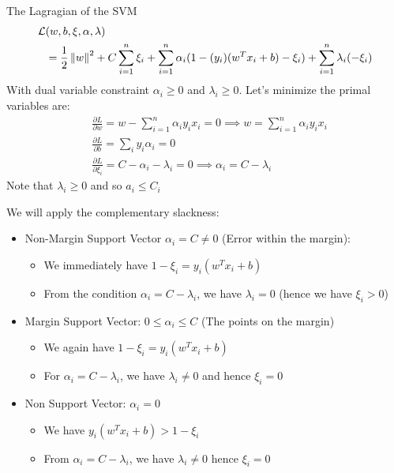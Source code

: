 \begin{remark}
    The Lagragian of the SVM 
    \begin{equation*}
    \begin{aligned}
        \mathcal{L}&(w, b,\xi,\alpha,\lambda) \\
        &= \frac{1}{2}\left\lVert w\right\rVert^2 + C\sum^n_{i=1}\xi_i + \sum^n_{i=1}\alpha_i(1-(y_i)(w^Tx_i + b)-\xi_i) + \sum^n_{i=1}\lambda_i(-\xi_i) 
    \end{aligned}
    \end{equation*}
    With dual variable constraint $\alpha_i\ge0$ and $\lambda_i\ge0$. Let's minimize the primal variables are:
    \begin{equation*}
    \begin{aligned}
        &\frac{\partial L}{\partial w} = w -\sum^n_{i=1}\alpha_iy_ix_i=0\implies w = \sum^n_{i=1}\alpha_iy_ix_i \\
        &\frac{\partial L}{\partial b} = \sum_iy_i\alpha_i = 0 \\
        &\frac{\partial L}{\partial \xi_i} = C-\alpha_i-\lambda_i = 0 \implies \alpha_i = C -\lambda_i
    \end{aligned}
    \end{equation*}    
    Note that $\lambda_i\ge0$ and so $a_i\le C_i$
\end{remark}
\begin{remark}
    We will apply the complementary slackness: 
    \begin{itemize}
        \item Non-Margin Support Vector $\alpha_i=C\ne0$ (Error within the margin):
        \begin{itemize}
            \item We immediately have $1-\xi_i = y_i(w^Tx_i + b)$
            \item From the condition $\alpha_i = C-\lambda_i$, we have $\lambda_i = 0$ (hence we have $\xi_i>0$)
        \end{itemize}
        \item Margin Support Vector: $0\le\alpha_i\le C$ (The points on the margin)
        \begin{itemize}
            \item We again have $1-\xi_i = y_i(w^Tx_i + b)$
            \item For $\alpha_i = C-\lambda_i$, we have $\lambda_i\ne0$ and hence $\xi_i = 0$
        \end{itemize}
        \item Non Support Vector: $\alpha_i=0$
        \begin{itemize}
            \item We have $y_i(w^Tx_i + b)>1-\xi_i$
            \item From $\alpha_i = C-\lambda_i$, we have $\lambda_i\ne0$ hence $\xi_i=0$
        \end{itemize}
    \end{itemize}
\end{remark}

